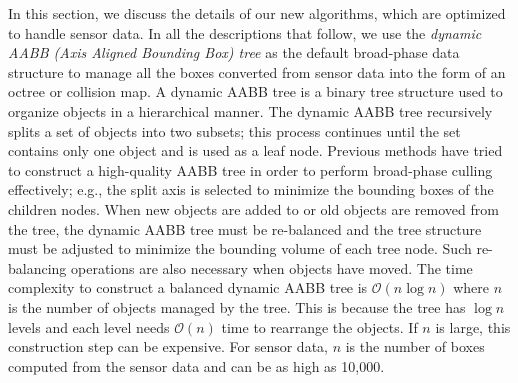 In this section, we discuss the details of our new algorithms,
which are optimized to handle sensor data. In all the descriptions that follow,
we use the \emph{dynamic AABB (Axis Aligned Bounding Box) tree} as the default broad-phase data structure to manage all the boxes converted from sensor data into the form of an octree or collision map. A dynamic AABB tree is a binary tree
structure used to organize objects in a hierarchical manner. The dynamic AABB tree recursively splits a set of objects into two subsets; this process continues until the set contains only one object and is used as a leaf node. Previous methods have tried to construct a high-quality AABB tree in order to perform broad-phase culling effectively; e.g., the split axis is selected to minimize the
bounding boxes of the children nodes. When new objects
are added to or old objects are removed from the tree, the dynamic AABB tree must be
re-balanced and the tree structure must be adjusted to minimize the bounding volume of
each tree node. Such re-balancing operations are also necessary when
objects have moved. The time complexity to construct a balanced dynamic AABB tree is $\mathcal
O(n \log n)$ where $n$ is the number of objects managed by the
tree. This is because the tree has $\log n$ levels and each level
needs $\mathcal O(n)$ time to rearrange the objects. If $n$ is large,
this construction step can be expensive. For sensor data, $n$ is the number of boxes computed from the sensor data and can be as high as 10,000.

